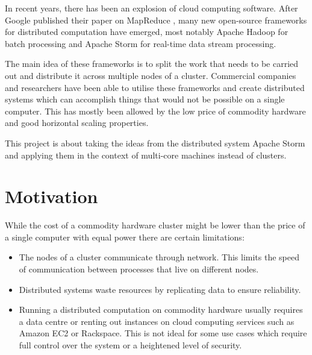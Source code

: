 \documentclass[bsc,logo,frontabs,twoside,singlespacing,normalheadings,parskip]{infthesis}     %
\begin{document}
In recent years, there has been an explosion of cloud computing software. After Google published their paper on MapReduce \cite{Anonymous:Jj3E6x7v}, many new open-source frameworks for distributed computation have emerged, most notably Apache Hadoop for batch processing and Apache Storm for real-time data stream processing.

The main idea of these frameworks is to split the work that needs to be carried out and distribute it across multiple nodes of a cluster. Commercial companies and researchers have been able to utilise these frameworks and create distributed systems \cite{5billion-sessions} which can accomplish things that would not be possible on a single computer. This has mostly been allowed by the low price of commodity hardware and good horizontal scaling properties.

This project is about taking the ideas from the distributed system Apache Storm and applying them in the context of multi-core machines instead of clusters.

\section{Motivation}

While the cost of a commodity hardware cluster might be lower than the price of a single computer with equal power there are certain limitations:

\begin{itemize}

\item The nodes of a cluster communicate through network. This limits the speed of communication between processes that live on different nodes.

\item Distributed systems waste resources by replicating data to ensure reliability.

\item Running a distributed computation on commodity hardware usually requires a data centre or renting out instances on cloud computing services such as Amazon EC2 or Rackspace. This is not ideal for some use cases which require full control over the system or a heightened level of security. 

\end{itemize}
\end{document}
